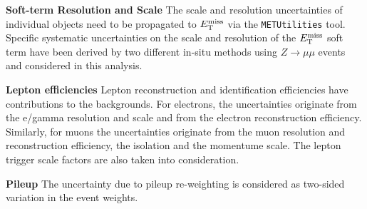 \begin{description}
\item{{\boldmath \met} {\bf Soft-term Resolution and Scale}} The scale
  and resolution uncertainties of individual objects need to be
  propagated to $E_{\mathrm{T}}^{\mathrm{miss}}$ via the {\tt METUtilities} tool. Specific
  systematic uncertainties on the scale and resolution of the $E_{\mathrm{T}}^{\mathrm{miss}}$
  soft term have been derived by two different in-situ methods using
  $Z \rightarrow \mu\mu$ events~\cite{Aad:2012re} and considered in
  this analysis. %

\item{\bf Lepton efficiencies} Lepton reconstruction and identification efficiencies have contributions to the backgrounds. For electrons, the uncertainties originate from the e/gamma resolution and scale and from the electron reconstruction efficiency. Similarly, for muons the uncertainties originate from the muon resolution and reconstruction efficiency, the isolation and the momentume scale. The lepton trigger scale factors are also taken into consideration.  

\item{\bf Pileup} The uncertainty due to pileup re-weighting is
  considered as two-sided variation in the event weights. %






\end{description}
